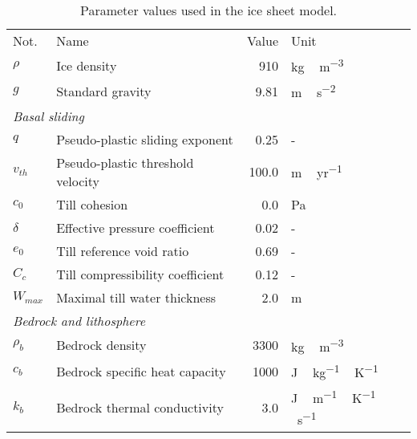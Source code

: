 \documentclass[tc, manuscript]{copernicus}
\begin{document}


\newpage

\begin{table*}
  \centering
  \caption{Parameter values used in the ice sheet model.}
  \label{tab:params}
  {\begin{tabular}{llrl}
    \tophline
    Not.    & Name & Value & Unit \\
    \middlehline

    $\rho$  & Ice density
            & 910
            & \unit{kg\,m^{-3}} \\

    $g$     & Standard gravity
            & 9.81
            & \unit{m\,s^{-2}} \\

    \multicolumn{2}{l}{\emph{Basal sliding}} \\

    $q$     & Pseudo-plastic sliding exponent
            & 0.25
            & - \\

    $v_{th}$& Pseudo-plastic threshold velocity
            & 100.0
            & \unit{m\,yr^{-1}} \\

    $c_0$   & Till cohesion
            & 0.0
            & Pa \\

    $\delta$& Effective pressure coefficient
            & 0.02
            & - \\

    $e_0$   & Till reference void ratio
            & 0.69
            & - \\

    $C_c$   & Till compressibility coefficient
            & 0.12
            & - \\

    $W_{max}$ & Maximal till water thickness
            & 2.0
            & m \\

    \multicolumn{2}{l}{\emph{Bedrock and lithosphere}} \\

    $\rho_b$& Bedrock density
            & 3300
            & \unit{kg\,m^{-3}} \\

    $c_b$   & Bedrock specific heat capacity
            & 1000
            & \unit{J\,kg^{-1}\,K^{-1}} \\

    $k_b$   & Bedrock thermal conductivity
            & 3.0
            & \unit{J\,m^{-1}\,K^{-1}\,s^{-1}} \\


\end{tabular}}
\end{table*}
\end{document}
